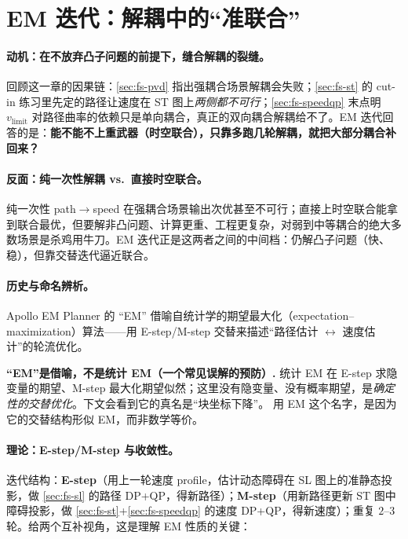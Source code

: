 \section{EM 迭代：解耦中的“准联合”}
\label{sec:fs-em}

\paragraph{动机：在不放弃凸子问题的前提下，缝合解耦的裂缝。}
回顾这一章的因果链：\cref{sec:fs-pvd} 指出强耦合场景解耦会失败；\cref{sec:fs-st} 的 cut-in 练习里先定的路径让速度在 ST 图上\emph{两侧都不可行}；\cref{sec:fs-speedqp} 末点明 $v_{\mathrm{limit}}$ 对路径曲率的依赖只是单向耦合，真正的双向耦合解耦给不了。EM 迭代回答的是：\textbf{能不能不上重武器（时空联合），只靠多跑几轮解耦，就把大部分耦合补回来？}

\paragraph{反面：纯一次性解耦 vs.\ 直接时空联合。}
纯一次性 path$\to$speed 在强耦合场景输出次优甚至不可行；直接上时空联合能拿到联合最优，但要解非凸问题、计算更重、工程更复杂，对弱到中等耦合的绝大多数场景是杀鸡用牛刀。EM 迭代正是这两者之间的中间档：仍解凸子问题（快、稳），但靠交替迭代逼近联合。

\paragraph{历史与命名辨析。}
Apollo EM Planner\cite{fan2018baidu} 的 “EM” 借喻自统计学的期望最大化（expectation--maximization）算法——用 E-step/M-step 交替来描述“路径估计 $\leftrightarrow$ 速度估计”的轮流优化。

\begin{note}
\textbf{“EM”是借喻，不是统计 EM（一个常见误解的预防）.}\;
统计 EM 在 E-step 求隐变量的期望、M-step 最大化期望似然；这里没有隐变量、没有概率期望，是\emph{确定性的交替优化}。下文会看到它的真名是“块坐标下降”。\cite{fan2018baidu} 用 EM 这个名字，是因为它的交替结构形似 EM，而非数学等价。
\end{note}

\paragraph{理论：E-step/M-step 与收敛性。}
迭代结构：\textbf{E-step}（用上一轮速度 profile，估计动态障碍在 SL 图上的准静态投影，做 \cref{sec:fs-sl} 的路径 DP+QP，得新路径）；\textbf{M-step}（用新路径更新 ST 图中障碍投影，做 \cref{sec:fs-st}+\cref{sec:fs-speedqp} 的速度 DP+QP，得新速度）；重复 $2$--$3$ 轮。给两个互补视角，这是理解 EM 性质的关键：

